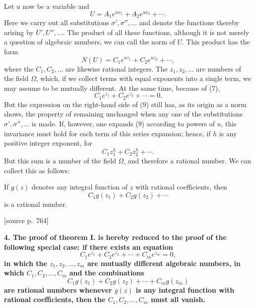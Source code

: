 \documentclass[11pt]{article}
\newcommand{\srcpage}[1]{\par\medskip\noindent\textsf{[source p.~#1]}\par\smallskip}
\begin{document}
Let $u$ now be a variable and
\begin{equation}\tag{8}
U=A_1e^{ux_1}+A_2e^{ux_2}+\cdots .
\end{equation}
Here we carry out all substitutions $\sigma',\sigma'',\ldots$ and denote the functions thereby arising by $U',U'',\ldots$. The product of all these functions, although it is not merely a question of algebraic numbers, we can call the norm of $U$. This product has the form
\begin{equation}\tag{9}
N(U)=C_1e^{uz_1}+C_2e^{uz_2}+\cdots,
\end{equation}
where the $C_1,C_2,\ldots$ are likewise rational integers. The $z_1,z_2,\ldots$ are numbers of the field $\Omega$, which, if we collect terms with equal exponents into a single term, we may assume to be mutually different. At the same time, because of (7),
\begin{equation}\tag{10}
C_1e^{z_1}+C_2e^{z_2}+\cdots=0.
\end{equation}
But the expression on the right-hand side of (9) still has, as its origin as a norm shows, the property of remaining unchanged when any one of the substitutions $\sigma',\sigma'',\ldots$ is made. If, however, one expands (9) according to powers of $u$, this invariance must hold for each term of this series expansion; hence, if $h$ is any positive integer exponent, for
\[
C_1z_1^h+C_2z_2^h+\cdots.
\]
But this sum is a number of the field $\Omega$, and therefore a rational number. We can collect this as follows:

If $g(z)$ denotes any integral function of $z$ with rational coefficients, then
\[
C_1g(z_1)+C_2g(z_2)+\cdots
\]
is a rational number.

\srcpage{764}
\textbf{4. The proof of theorem I. is hereby reduced to the proof of the following special case: if there exists an equation}
\begin{equation}\tag{11}
C_1e^{z_1}+C_2e^{z_2}+\cdots+C_me^{z_m}=0,
\end{equation}
\textbf{in which the $z_1,z_2,\ldots,z_m$ are mutually different algebraic numbers, in which $C_1,C_2,\ldots,C_m$ and the combinations}
\begin{equation}\tag{12}
C_1g(z_1)+C_2g(z_2)+\cdots+C_mg(z_m)
\end{equation}
\textbf{are rational numbers whenever $g(z)$ is any integral function with rational coefficients, then the $C_1,C_2,\ldots,C_m$ must all vanish.}
\end{document}
